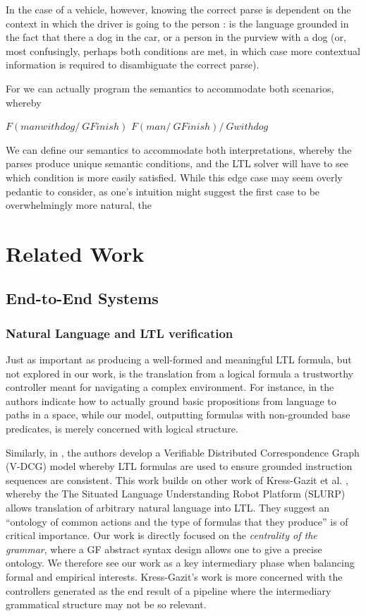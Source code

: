 \documentclass{article}
\begin{document}
In the case of a vehicle, however, knowing the correct parse is dependent on
the context in which the driver is going to the person : is the language
grounded in the fact that there a dog in the car, or a person in the purview
with a dog (or, most confusingly, perhaps both conditions are met, in which case
more contextual information is required to disambiguate the correct parse).

For we can actually program the semantics to accommodate both scenarios, whereby

$F (manwithdog /\ G Finish)$
$F (man /\ G Finish) /\ G withdog$

We can define our semantics to accommodate both interpretations, whereby the
parses produce unique semantic conditions, and the LTL solver will have to see
which condition is more easily satisfied. While this edge case may seem overly
pedantic to consider, as one's intuition might suggest the first case to be
overwhelmingly more natural, the


\section{Related Work}

\subsection{End-to-End Systems}

\subsubsection{Natural Language and LTL verification}


Just as important as producing a well-formed and meaningful LTL formula, but not
explored in our work, is the translation from a logical formula a trustworthy
controller meant for navigating a complex environment. For instance, in
\cite{plaku2016motion} the authors indicate how to actually ground basic
propositions from language to paths in a space, while our model, outputting
formulas with non-grounded base predicates, is merely concerned with logical
structure.

Similarly, in \cite{7759412}, the authors develop a Verifiable Distributed
Correspondence Graph (V-DCG) model whereby LTL formulas are used to ensure
grounded instruction sequences are consistent. This work builds on other work of
Kress-Gazit et al. \cite{provCorrectNatControl}, whereby the The Situated
Language Understanding Robot Platform (SLURP) allows translation of arbitrary
natural language into LTL. They suggest an ``ontology of common actions and the
type of formulas that they produce'' is of critical importance. Our work is
directly focused on the \emph{centrality of the grammar}, where a GF abstract
syntax design allows one to give a precise ontology. We therefore see our work as
a key intermediary phase when balancing formal and empirical interests.
Kress-Gazit's work is more concerned with the controllers generated as the end
result of a pipeline where the intermediary grammatical structure may not be so
relevant.
\end{document}
